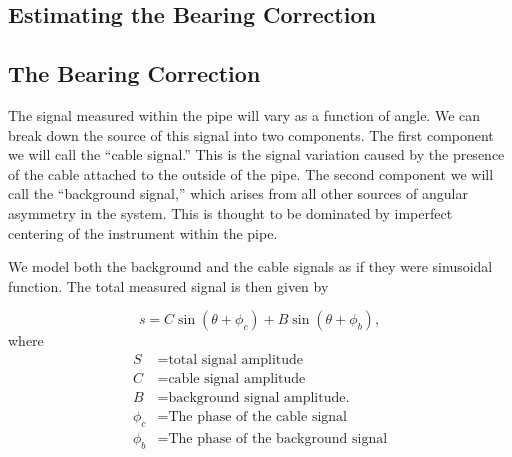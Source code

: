 \documentclass[paper=a4, fontsize=11pt]{scrartcl}
\numberwithin{equation}{section}		%
\numberwithin{figure}{section}			%
\numberwithin{table}{section}				%
\begin{document}
\begin{appendices}




\section{Estimating the Bearing Correction}
\subsection{The Bearing Correction}
The signal measured within the pipe will vary as a function of angle.  We can break down the source of this signal into two components.  The first component we will call the ``cable signal.''  This is the signal variation caused by the presence of the cable attached to the outside of the pipe.  The second component we will call the ``background signal,'' which arises from all other sources of angular asymmetry in the system.  This is thought to be dominated by imperfect centering of the instrument within the pipe.

\par We model both the background and the cable signals as if they were sinusoidal function. The total measured signal is then given by

\begin{equation} \label{eq:trig_sig}
    s = C \sin\left(\theta + \phi_c\right) + B \sin\left(\theta + \phi_b\right),
\end{equation}
where
\begin{align}
        S &= \text{total signal amplitude} \\
        C &= \text{cable signal amplitude} \\
        B &= \text{background signal amplitude.} \\
        \phi_c &= \text{The phase of the cable signal}\\
        \phi_b &= \text{The phase of the background signal}\\
\end{align}


\end{appendices}
\end{document}
